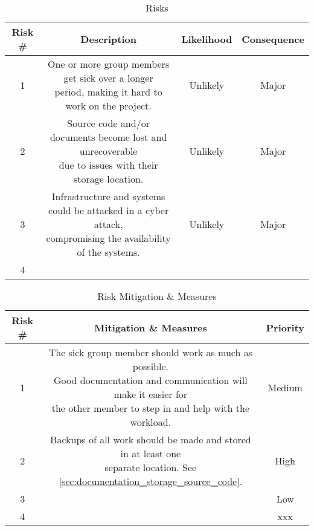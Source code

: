 \begin{table}[H]
    \centering
    \begin{tabular}{|c|c|c|c|}
    \hline
    Risk \# & Description & Likelihood & Consequence \\
    \hline
    1 & \makecell{One or more group members get sick over a longer \\period, making it hard to work on the project.} & Unlikely \cellcolor[HTML]{ffC300} & Major \cellcolor[HTML]{ffC300} \\
    \hline
    2 & \makecell{Source code and/or documents become lost and unrecoverable \\due to  issues with their storage location.} & Unlikely \cellcolor[HTML]{ffC300} & Major \cellcolor[HTML]{ffC300} \\
    \hline
    3 & \makecell{Infrastructure and systems could be attacked in a cyber attack, \\compromising the availability of the systems. } & Unlikely \cellcolor[HTML]{ffC300} & Major\cellcolor[HTML]{ffC300} \\
    \hline
    4 & & \cellcolor[HTML]{74ff00} & \cellcolor[HTML]{74ff00} \\
    \hline
    \end{tabular}
    \caption{Risks}
    \label{tab:risks}
\end{table}

\begin{table}[H]
    \centering
    \begin{tabular}{|c|c|c|}
    \hline
    Risk \# & Mitigation \& Measures & Priority \\
    \hline
    1 & \makecell{The sick group member should work as much as possible. \\ Good documentation and communication will make it easier for \\ the other member to step in and help with the workload.} & Medium \cellcolor[HTML]{fff000} \\
    \hline
    2 & \makecell{Backups of all work should be made and stored in at least one \\separate location. See \ref{sec:documentation_storage_source_code}.} & High \cellcolor[HTML]{ff4233} \\
    \hline
    3 & & Low \cellcolor[HTML]{fff000} \\
    \hline
    4 & & xxx \cellcolor[HTML]{74ff00} \\
    \hline
    \end{tabular}
    \caption{Risk Mitigation \& Measures}
    \label{tab:risk_mitigation}
\end{table}